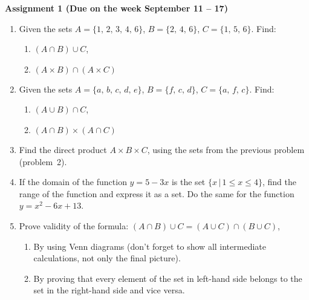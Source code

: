 \documentclass{article}
\begin{document}
\fontsize{14}{21}
\selectfont
\centerline{\textbf{Assignment 1 (Due on the week September 11 -- 17)}}
\fontsize{12}{18}
\selectfont
\begin{enumerate}

\item Given the sets $A=\{1,\, 2,\, 3,\, 4,\, 6\}$, $B=\{2,\, 4,\, 6\}$, $C=\{1,\, 5,\, 6\}$.  Find:

	\begin{enumerate}
\item $(A\cap B)\cup C$,
\item $(A\times B)\cap (A\times C)$
\end{enumerate}

\item Given the sets $A=\{a,\, b,\, c,\, d,\, e\}$, $B=\{f,\, c,\, d\}$, $C=\{a,\, f,\, c\}$.  Find:
	\begin{enumerate}
\item $(A\cup B)\cap C$,
\item $(A\cap B)\times (A\cap C)$
\end{enumerate}


\item Find the direct product $A\times B\times C$, using the sets from the previous problem (problem~2).

\item  If the domain of the function $y=5-3x$ is the set $\{x\,|\,1\leqslant x\leqslant 4\}$, find the range of the function and express it as a set. Do the same for the function $y=x^2-6x+13$.

\item Prove validity of the formula: $(A\cap B)\cup C=(A\cup C)\cap (B\cup C)$,
\begin{enumerate}
\item By using Venn diagrams (don't forget to show all intermediate calculations, not only the final picture).
\item By proving that every element of the set in left-hand side belongs to the set in the right-hand side and vice versa.
\end{enumerate}

\end{enumerate}
\end{document}
